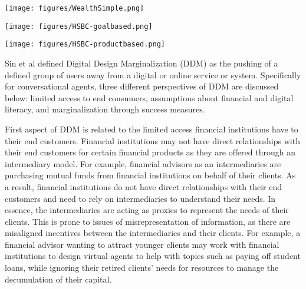 \begin{marginfigure}[-0pc]
  \begin{minipage}{\marginparwidth}
    \centering
    \texttt{[image: figures/WealthSimple.png]}
    \caption{WealthSimple: example of financial services segregated by net worth\footnote{https://www.wealthsimple.com/en-ca/invest/managed-investing}}
    \label{fig:ws_tieredservice}
  \end{minipage}
\end{marginfigure}

\begin{marginfigure}[-12pc]
  \begin{minipage}{\marginparwidth}
    \centering
    \texttt{[image: figures/HSBC-goalbased.png]}
    \caption{HSBC: Inquiries based on personal goals was not interpreted correctly}
    \label{fig:hsbc-goalbased}
  \end{minipage}
\end{marginfigure}

\begin{marginfigure}[1pc]
  \begin{minipage}{\marginparwidth}
    \centering
    \texttt{[image: figures/HSBC-productbased.png]}
    \caption{HSBC: Inquiries based on financial product terms was interpreted correctly}
    \label{fig:hsbc-productbased}
  \end{minipage}
\end{marginfigure}

Sin et al \cite{sin2021digital} defined Digital Design Marginalization (DDM) as the pushing of a defined group of users away from a digital or online service or system. Specifically for conversational agents, three different perspectives of DDM are discussed below: limited access to end consumers, assumptions about financial and digital literacy, and marginalization through success measures.

First aspect of DDM is related to the limited access financial institutions have to their end customers. Financial institutions may not have direct relationships with their end customers for certain financial products as they are offered through an intermediary model. For example, financial advisors as an intermediaries are purchasing mutual funds from financial institutions on behalf of their clients. As a result, financial institutions do not have direct relationships with their end customers and need to rely on intermediaries to understand their needs. In essence, the intermediaries are acting as proxies to represent the needs of their clients. This is prone to issues of misrepresentation of information, as there are misaligned incentives between the intermediaries and their clients. For example, a financial advisor wanting to attract younger clients may work with financial institutions to design virtual agents to help with topics such as paying off student loans, while ignoring their retired clients' needs for resources to manage the decumulation of their capital.

